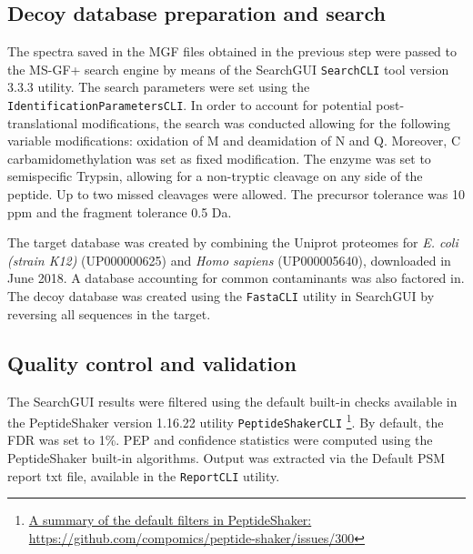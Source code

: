 
\subsection{Decoy database preparation and search}
\label{subsec:database_preparation}

The spectra saved in the MGF files obtained in the previous step were passed to the MS-GF+ search engine \cite{Kim2014} by means of the SearchGUI \texttt{SearchCLI} tool version 3.3.3 \cite{Barsnes2018} utility. The search parameters were set using the \texttt{IdentificationParametersCLI}. In order to account for potential post-translational modifications, the search was conducted allowing for the following variable modifications: oxidation of M and deamidation of N and Q. Moreover, C carbamidomethylation was set as fixed modification. The enzyme was set to semispecific Trypsin, allowing for a non-tryptic cleavage on any side of the peptide. Up to two missed cleavages were allowed. The precursor tolerance was 10 ppm and the fragment tolerance 0.5 Da. 


The target database was created by combining the Uniprot proteomes for \textit{E. coli (strain K12)} (UP000000625) and \textit{Homo sapiens} (UP000005640), downloaded in June 2018. A database accounting for common contaminants was also factored in. The decoy database was created using the \texttt{FastaCLI} utility in SearchGUI by reversing all sequences in the target.

\subsection{Quality control and validation}

The SearchGUI results were filtered using the default built-in checks available in the PeptideShaker version 1.16.22 utility \texttt{PeptideShakerCLI} \cite{Vaudel2015} \footnote{\href{A summary of the validation filters in PeptideShaker https://github.com/compomics/peptide-shaker/issues/300}{A summary of the default filters in PeptideShaker: https://github.com/compomics/peptide-shaker/issues/300}}. By default, the FDR was set to 1\%. PEP and confidence statistics were computed using the PeptideShaker built-in algorithms. Output was extracted via the Default PSM report txt file, available in the \texttt{ReportCLI} utility.


